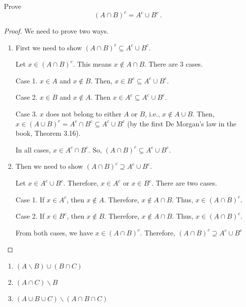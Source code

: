\documentclass[12pt]{amsart}
\begin{document}
\begin{problem}[Exercise 3.12]
Prove
\begin{equation*}
	( A \cap B)^c = A^c \cup B^c \,.
\end{equation*}
\end{problem}
\begin{proof}
	We need to prove two ways.
	\begin{enumerate}[1.]
		\item First we need to show $ ( A \cap B)^c \subseteq A^c \cup B^c $.

		      Let $x \in (A \cap B)^c$.
		      This means $ x \not\in A \cap B$.
		      There are 3 cases.

		      Case 1. $x \in A$ and $x \not\in B$.
		      Then, $x \in B^c \subseteq A^c \cup B^c$.

		      Case 2. $x \in B$ and $x \not \in A$.
		      Then $x \in A^c\subseteq A^c \cup B^c$.

		      Case 3. $x$ does not belong to either $A$ or $B$, i.e., $x \not\in A\cup B$.
		      Then, $x\in (A \cup B)^c = A^c \cap B^c\subseteq A^c \cup B^c$ (by the first De Morgan's law in the book, Theorem 3.16).

		      In all cases, $x \in A^c \cap B^c$.
		      So, $ ( A \cap B)^c \subseteq A^c \cup B^c $.
		      \\
		\item Then we need to show $ ( A \cap B)^c \supseteq A^c \cup B^c $.

		      Let $x \in A^c \cup B^c$.
		      Therefore, $x \in A^c$ or $x \in B^c$. There are two cases.

		      Case 1. If $x \in A^c$, then $x \not\in A$. Therefore,
		      $x \not\in A \cap B$. Thus, $x\in (A \cap B)^c$.

		      Case 2. If $x \in B^c$, then $x \not\in B$. Therefore,
		      $x \not\in A \cap B$. Thus, $x\in (A \cap B)^c$.

		      From both cases, we have
		      $x\in (A \cap B)^c$.
		      Therefore, $ ( A \cap B)^c \supseteq A^c \cup B^c $
	\end{enumerate}
\end{proof}


\begin{problem}[Exercise 3.14]
\begin{enumerate}
	\item $(A \backslash B) \cup (B \cap C)$
	\item $  (A \cap C ) \backslash B $
	\item $(A \cup B \cup C ) \backslash (A \cap B \cap C) $
\end{enumerate}
\end{problem}
\end{document}
